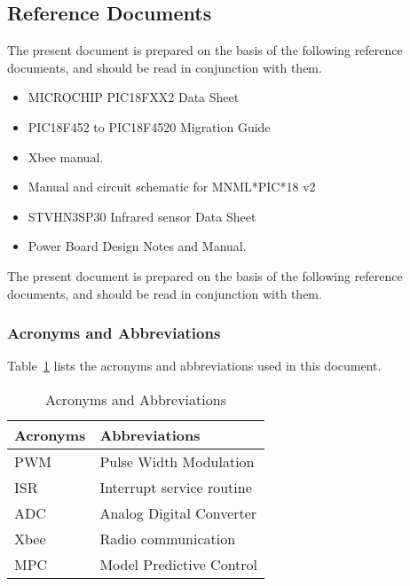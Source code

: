 \subsection{Reference Documents}
    The present document is prepared on the basis of the following reference documents, and should be read in conjunction with them.\\
    \begin {itemize}
    	\item  MICROCHIP PIC18FXX2 Data Sheet
    	\item  PIC18F452 to PIC18F4520 Migration Guide
    	\item Xbee manual.
    	\item Manual and circuit schematic for MNML*PIC*18 v2
    	\item STVHN3SP30 Infrared sensor Data Sheet
    	\item Power Board Design Notes and Manual.
    \end{itemize}  The present document is prepared on the basis of the following reference documents, and should be read in conjunction with them.\\
\pagebreak
\subsubsection{ Acronyms and Abbreviations}
Table~\ref{Acro} lists the acronyms and abbreviations used in this document.
\begin{table}[h]
  \centering
  \caption{Acronyms and Abbreviations}
  \label{Acro}
	\begin{tabular}{| l | l | }
  	\hline
  	\textbf{Acronyms} & \textbf{Abbreviations}		\\ \hline
  	PWM	     & Pulse Width Modulation	\\ \hline
  	ISR      & Interrupt service routine \\ \hline
  	ADC      & Analog Digital Converter   \\ \hline
  	Xbee     & Radio communication	\\ \hline
    MPC      & Model Predictive Control \\
  	\hline
	\end{tabular}
\end{table}

